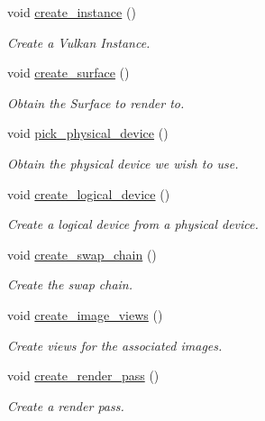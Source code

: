 \begin{DoxyCompactItemize}
void \mbox{\hyperlink{classvulkan__application_a7eeae31c672464518ea0ba45ca39c00b}{create\+\_\+instance}} ()
\begin{DoxyCompactList}\small\item\em Create a Vulkan Instance. \end{DoxyCompactList}\item 
void \mbox{\hyperlink{classvulkan__application_a53302651b78b29d293cf912542fa8438}{create\+\_\+surface}} ()
\begin{DoxyCompactList}\small\item\em Obtain the Surface to render to. \end{DoxyCompactList}\item 
void \mbox{\hyperlink{classvulkan__application_ac2d9b18a54bf14c420522a4d5f9e7315}{pick\+\_\+physical\+\_\+device}} ()
\begin{DoxyCompactList}\small\item\em Obtain the physical device we wish to use. \end{DoxyCompactList}\item 
void \mbox{\hyperlink{classvulkan__application_a495dd01f2cac024f7ee25423eeaf2f84}{create\+\_\+logical\+\_\+device}} ()
\begin{DoxyCompactList}\small\item\em Create a logical device from a physical device. \end{DoxyCompactList}\item 
void \mbox{\hyperlink{classvulkan__application_a2a747a8bf6911b9aa0113220640e70ea}{create\+\_\+swap\+\_\+chain}} ()
\begin{DoxyCompactList}\small\item\em Create the swap chain. \end{DoxyCompactList}\item 
void \mbox{\hyperlink{classvulkan__application_a0b38ad71f195c9a939dc39ec873dfd21}{create\+\_\+image\+\_\+views}} ()
\begin{DoxyCompactList}\small\item\em Create views for the associated images. \end{DoxyCompactList}\item 
void \mbox{\hyperlink{classvulkan__application_ade5cf429209c6ed274931cbae3a35824}{create\+\_\+render\+\_\+pass}} ()
\begin{DoxyCompactList}\small\item\em Create a render pass. \end{DoxyCompactList}\item 

\end{DoxyCompactItemize}
